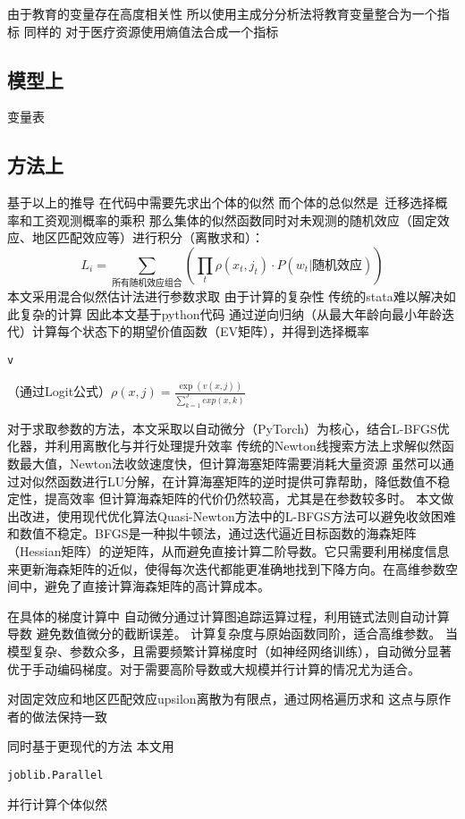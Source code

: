 \documentclass{article}
\numberwithin{equation}{section} %
\begin{document}
由于教育的变量存在高度相关性
所以使用主成分分析法将教育变量整合为一个指标
同样的
对于医疗资源使用熵值法合成一个指标


\subsection{模型上}
变量表

\subsection{方法上} %
\label{sub:方法上}
基于以上的推导
在代码中需要先求出个体的似然
而个体的总似然是 迁移选择概率和工资观测概率的乘积
那么集体的似然函数同时对未观测的随机效应（固定效应、地区匹配效应等）进行积分（离散求和）：
$$
L_{i}=\sum\limits_{\text{所有随机效应组合}}(\prod_{t}\rho(x_{t},j_{t})⋅P(w_{t}|\text{随机效应}))$$
本文采用混合似然估计法进行参数求取
由于计算的复杂性
传统的stata难以解决如此复杂的计算
因此本文基于python代码
通过逆向归纳（从最大年龄向最小年龄迭代）计算每个状态下的期望价值函数（EV矩阵），并得到选择概率\begin{verbatim}v\end{verbatim}（通过Logit公式）$\rho(x,j)=\frac{\exp(v(x,j))}{\sum\limits_{k=1}^{J} exp(x,k)}$


对于求取参数的方法，本文采取以自动微分（PyTorch）为核心，结合L-BFGS优化器，并利用离散化与并行处理提升效率
传统的Newton线搜索方法上求解似然函数最大值，Newton法收敛速度快，但计算海塞矩阵需要消耗大量资源
虽然可以通过对似然函数进行LU分解，在计算海塞矩阵的逆时提供可靠帮助，降低数值不稳定性，提高效率
但计算海森矩阵的代价仍然较高，尤其是在参数较多时。
本文做出改进，使用现代优化算法Quasi-Newton方法中的L-BFGS方法可以避免收敛困难和数值不稳定。BFGS是一种拟牛顿法，通过迭代逼近目标函数的海森矩阵（Hessian矩阵）的逆矩阵，从而避免直接计算二阶导数。它只需要利用梯度信息来更新海森矩阵的近似，使得每次迭代都能更准确地找到下降方向。在高维参数空间中，避免了直接计算海森矩阵的高计算成本。

在具体的梯度计算中
自动微分通过计算图追踪运算过程，利用链式法则自动计算导数
避免数值微分的截断误差。
计算复杂度与原始函数同阶，适合高维参数。
当模型复杂、参数众多，且需要频繁计算梯度时（如神经网络训练），自动微分显著优于手动编码梯度。对于需要高阶导数或大规模并行计算的情况尤为适合。

对固定效应和地区匹配效应upsilon离散为有限点，通过网格遍历求和
这点与原作者的做法保持一致

同时基于更现代的方法
本文用\begin{verbatim}joblib.Parallel\end{verbatim}并行计算个体似然
\end{document}
